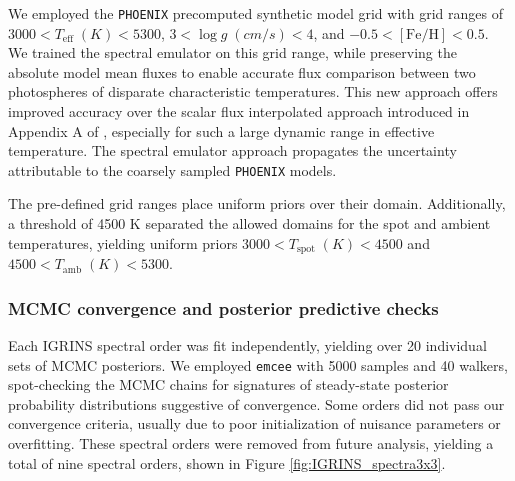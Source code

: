 \documentclass[twocolumn]{emulateapj}%
\begin{document}
We employed the \texttt{PHOENIX} precomputed synthetic model grid with grid ranges of $3000 < T_{\mathrm{eff}} \; (K) < 5300 $, $3 < \log{g \;(cm/s)}  < 4 $, and $ -0.5 <  [\mathrm{Fe}/\mathrm{H}] <0.5$.  We trained the spectral emulator \citep{czekala15} on this grid range, while preserving the absolute model mean fluxes to enable accurate flux comparison between two photospheres of disparate characteristic temperatures.  This new approach offers improved accuracy over the scalar flux interpolated approach introduced in Appendix A of \citet{gullysantiago17}, especially for such a large dynamic range in effective temperature.  The spectral emulator approach propagates the uncertainty attributable to the coarsely sampled \texttt{PHOENIX} models.

The pre-defined grid ranges place uniform priors over their domain.  Additionally, a threshold of 4500 K separated the allowed domains for the spot and ambient temperatures, yielding uniform priors $3000 < T_{\mathrm{spot}} \; (K) < 4500 $ and $4500 < T_{\mathrm{amb}} \; (K) < 5300$.

\subsubsection{MCMC convergence and posterior predictive checks}

Each IGRINS spectral order was fit independently, yielding over 20 individual sets of MCMC posteriors.  We employed \texttt{emcee} \citep{foreman13} with 5000 samples and 40 walkers, spot-checking the MCMC chains for signatures of steady-state posterior probability distributions suggestive of convergence.  Some orders did not pass our convergence criteria, usually due to poor initialization of nuisance parameters or overfitting.  These spectral orders were removed from future analysis, yielding a total of nine spectral orders, shown in Figure \ref{fig:IGRINS_spectra3x3}.
\end{document}

